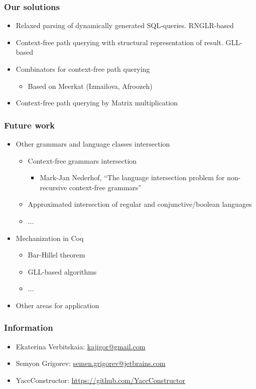 \documentclass{beamer}
\begin{document}
\begin{frame}
  \transwipe[direction=90]
  \frametitle{Our solutions}
  \begin{itemize}
    \item Relaxed parsing of dynamically generated SQL-queries. RNGLR-based
    \item Context-free path querying with structural representation of result. GLL-based
    \item Combinators for context-free path querying
    \begin{itemize}
        \item Based on Meerkat (Izmailova, Afroozeh)
    \end{itemize}
    \item Context-free path querying by Matrix multiplication
  \end{itemize}
\end{frame}

\begin{frame}[fragile]
\transwipe[direction=90]
\frametitle{Future work}
\begin{itemize}
  \item Other grammars and language classes intersection
  \begin{itemize}
     \item Context-free grammars intersection
     \begin{itemize}
        \item  Mark-Jan Nederhof, ``The language intersection problem for non-recursive context-free grammars''
     \end{itemize}
     \item Approximated intersection of regular and conjunctive/boolean languages
     \item ...
  \end{itemize}
  \item Mechanization in Coq
  \begin{itemize}
     \item Bar-Hillel theorem
     \item GLL-based algorithms
     \item ...
  \end{itemize}
  \item Other areas for application
\end{itemize}
\end{frame}
            
\begin{frame}
\transwipe[direction=90]
\frametitle{Information}
\begin{itemize}
  \item Ekaterina Verbitskaia: \href{mailto:kajigor@gmail.com}{kajigor@gmail.com}
  \item Semyon Grigorev: \href{mailto:semen.grigorev@jetbrains.com}{semen.grigorev@jetbrains.com}
  \item YaccConstructor: \href{https://github.com/YaccConstructor}{https://github.com/YaccConstructor}
\end{itemize}
\end{frame}
\end{document}
